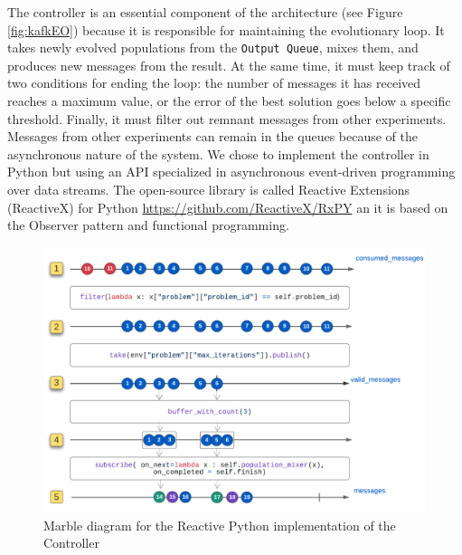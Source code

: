 \documentclass[review]{elsarticle}
\begin{document}
The controller is an essential component of the architecture (see Figure \ref{fig:kafkEO})
because it is responsible for maintaining the evolutionary loop. It takes newly
evolved populations from the \texttt{Output Queue}, mixes them,   and produces new
messages from the result. At the same time, it must keep track of two conditions
for ending the loop: the number of messages it has received reaches a maximum
value, or the error of the best solution goes below a specific threshold.  Finally, it
must filter out remnant messages from other experiments. Messages from other
experiments can remain in the queues because of the asynchronous nature of the
system.  We chose to implement the controller in Python but using an API
specialized in asynchronous event-driven programming over data streams.  
The open-source library is called Reactive Extensions (ReactiveX) for Python 
\url{https://github.com/ReactiveX/RxPY} an it is based on the Observer 
pattern \cite{gamma1995design} and functional programming.

\begin{figure}[ht]
    \centering
    \includegraphics[width=\textwidth]{marble_controller}
    \caption{Marble diagram for the Reactive Python implementation of the Controller}
    \label{fig:marble_controller}
\end{figure}
\end{document}
